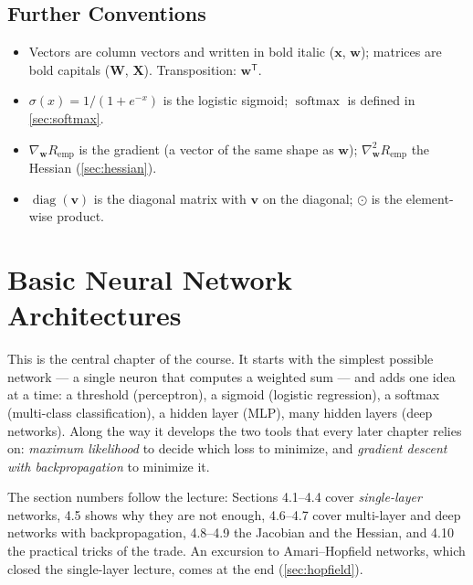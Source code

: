 \documentclass[11pt, oneside]{book}
\newcommand{\grad}{\nabla}               %
\newcommand{\hess}{\nabla^2}             %
\newcommand{\T}{^{\mathsf{T}}}           %
\newcommand{\diag}{\operatorname{diag}}
\DeclareMathOperator{\softmax}{softmax}
\newcommand{\bx}{\bm{x}}        \newcommand{\by}{\bm{y}}
\newcommand{\bw}{\bm{w}}        \newcommand{\bW}{\bm{W}}
\newcommand{\bX}{\bm{X}}        \newcommand{\bY}{\bm{Y}}
\newcommand{\Remp}{R_{\mathrm{emp}}}     %
\let\originalsection\section
\renewcommand{\section}{\Needspace{7\baselineskip}\originalsection}
\begin{document}
\section{Further Conventions}

\begin{itemize}
  \item Vectors are column vectors and written in bold italic ($\bx$, $\bw$);
    matrices are bold capitals ($\bW$, $\bX$). Transposition: $\bw\T$.
  \item $\sigma(x) = 1/(1 + e^{-x})$ is the logistic sigmoid; $\softmax$
    is defined in \cref{sec:softmax}.
  \item $\grad_{\bw} \Remp$ is the gradient (a vector of the same shape as
    $\bw$); $\hess_{\bw} \Remp$ the Hessian (\cref{sec:hessian}).
  \item $\diag(\bm{v})$ is the diagonal matrix with $\bm{v}$ on the diagonal;
    $\odot$ is the element-wise product.
\end{itemize}

\chapter{Basic Neural Network Architectures}
\label{ch:basic}

This is the central chapter of the course. It starts with the simplest
possible network --- a single neuron that computes a weighted sum --- and
adds one idea at a time: a threshold (perceptron), a sigmoid (logistic
regression), a softmax (multi-class classification), a hidden layer (MLP),
many hidden layers (deep networks). Along the way it develops the two tools
that every later chapter relies on: \emph{maximum likelihood} to decide
which loss to minimize, and \emph{gradient descent with backpropagation} to
minimize it.

The section numbers follow the lecture: Sections 4.1--4.4 cover
\emph{single-layer} networks, 4.5 shows why they are not enough, 4.6--4.7
cover multi-layer and deep networks with backpropagation, 4.8--4.9 the
Jacobian and the Hessian, and 4.10 the practical tricks of the trade. An
excursion to Amari--Hopfield networks, which closed the single-layer lecture,
comes at the end (\cref{sec:hopfield}).
\end{document}
